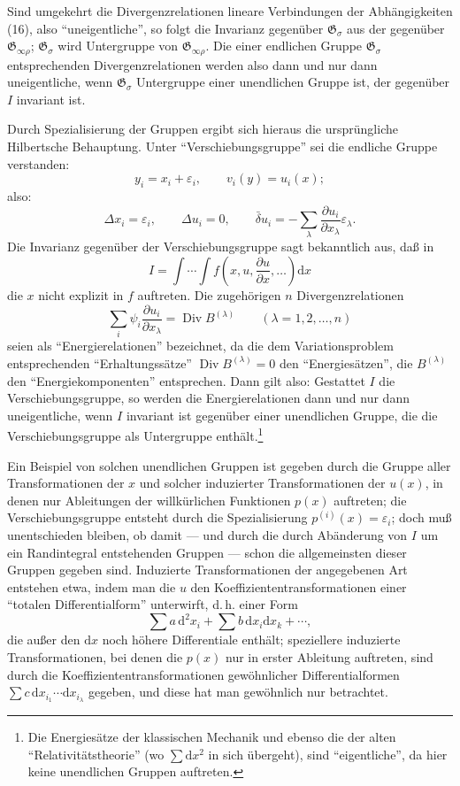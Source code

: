 \documentclass[11pt]{article}
\newcommand{\dd}{\mathrm d}
\newcommand{\Div}{\operatorname{Div}}
\newcommand{\G}{\mathfrak G}
\newcommand{\D}{\Delta}
\newcommand{\bd}{\bar{\delta}}
\newcommand{\eps}{\varepsilon}
\newcommand{\p}{\partial}
\begin{document}
Sind umgekehrt die Divergenzrelationen lineare Verbindungen der Abhängigkeiten (16), also ``uneigentliche'', so folgt die Invarianz gegenüber \(\G_\sigma\) aus der gegenüber \(\G_{\infty\rho}\); \(\G_\sigma\) wird Untergruppe von \(\G_{\infty\rho}\). Die einer endlichen Gruppe \(\G_\sigma\) entsprechenden Divergenzrelationen werden also dann und nur dann uneigentliche, wenn \(\G_\sigma\) Untergruppe einer unendlichen Gruppe ist, der gegenüber \(I\) invariant ist.

Durch Spezialisierung der Gruppen ergibt sich hieraus die ursprüngliche Hilbertsche Behauptung. Unter ``Verschiebungsgruppe'' sei die endliche Gruppe verstanden:
\[
y_i=x_i+\eps_i,\qquad v_i(y)=u_i(x);
\]
also:
\[
\D x_i=\eps_i,\qquad \D u_i=0,\qquad
\bd u_i=-\sum_\lambda\frac{\p u_i}{\p x_\lambda}\eps_\lambda.
\]
Die Invarianz gegenüber der Verschiebungsgruppe sagt bekanntlich aus, daß in
\[
I=\int\!\cdots\!\int f\!\left(x,u,\frac{\p u}{\p x},\ldots\right)\dd x
\]
die \(x\) nicht explizit in \(f\) auftreten. Die zugehörigen \(n\) Divergenzrelationen
\[
\sum_i\psi_i\frac{\p u_i}{\p x_\lambda}=\Div B^{(\lambda)}
\qquad(\lambda=1,2,\ldots,n)
\]
seien als ``Energierelationen'' bezeichnet, da die dem Variationsproblem entsprechenden ``Erhaltungssätze'' \(\Div B^{(\lambda)}=0\) den ``Energiesätzen'', die \(B^{(\lambda)}\) den ``Energiekomponenten'' entsprechen. Dann gilt also: Gestattet \(I\) die Verschiebungsgruppe, so werden die Energierelationen dann und nur dann uneigentliche, wenn \(I\) invariant ist gegenüber einer unendlichen Gruppe, die die Verschiebungsgruppe als Untergruppe enthält.\footnote{Die Energiesätze der klassischen Mechanik und ebenso die der alten ``Relativitätstheorie'' (wo \(\sum \dd x^2\) in sich übergeht), sind ``eigentliche'', da hier keine unendlichen Gruppen auftreten.}

Ein Beispiel von solchen unendlichen Gruppen ist gegeben durch die Gruppe aller Transformationen der \(x\) und solcher induzierter Transformationen der \(u(x)\), in denen nur Ableitungen der willkürlichen Funktionen \(p(x)\) auftreten; die Verschiebungsgruppe entsteht durch die Spezialisierung \(p^{(i)}(x)=\eps_i\); doch muß unentschieden bleiben, ob damit --- und durch die durch Abänderung von \(I\) um ein Randintegral entstehenden Gruppen --- schon die allgemeinsten dieser Gruppen gegeben sind. Induzierte Transformationen der angegebenen Art entstehen etwa, indem man die \(u\) den Koeffiziententransformationen einer ``totalen Differentialform'' unterwirft, d.\,h. einer Form
\[
\sum a\,\dd^2x_i+\sum b\,\dd x_i\dd x_k+\cdots,
\]
die außer den \(\dd x\) noch höhere Differentiale enthält; speziellere induzierte Transformationen, bei denen die \(p(x)\) nur in erster Ableitung auftreten, sind durch die Koeffiziententransformationen gewöhnlicher Differentialformen \(\sum c\,\dd x_{i_1}\cdots \dd x_{i_\lambda}\) gegeben, und diese hat man gewöhnlich nur betrachtet.
\end{document}
